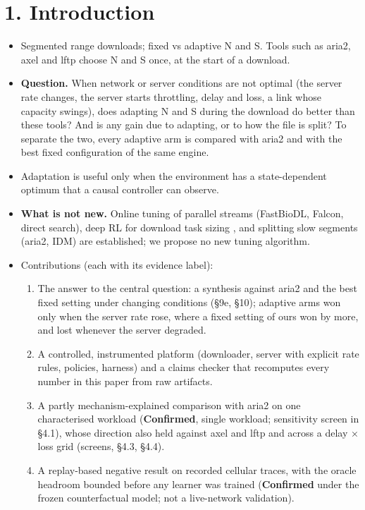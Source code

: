 \documentclass[conference]{IEEEtran}
\begin{document}
\section*{1. Introduction}

\begin{itemize}
\item Segmented range downloads; fixed vs adaptive N and S. Tools such as aria2, axel and lftp choose N and S once, at the start of a download.
\item \textbf{Question.} When network or server conditions are not optimal (the server rate changes, the server starts throttling, delay and loss, a link whose capacity swings), does adapting N and S during the download do better than these tools? And is any gain due to adapting, or to how the file is split? To separate the two, every adaptive arm is compared with aria2 and with the best fixed configuration of the same engine.
\item Adaptation is useful only when the environment has a state-dependent optimum that a causal controller can observe.
\item \textbf{What is not new.} Online tuning of parallel streams (FastBioDL, Falcon, direct search), deep RL for download task sizing \cite{liu2025deload}, and splitting slow segments (aria2, IDM) are established; we propose no new tuning algorithm.
\item Contributions (each with its evidence label):
\begin{enumerate}
\item The answer to the central question: a synthesis against aria2 and the best fixed setting under changing conditions (§9e, §10); adaptive arms won only when the server rate rose, where a fixed setting of ours won by more, and lost whenever the server degraded.
\item A controlled, instrumented platform (downloader, server with explicit rate rules, policies, harness) and a claims checker that recomputes every number in this paper from raw artifacts.
\item A partly mechanism-explained comparison with aria2 on one characterised workload (\textbf{Confirmed}, single workload; sensitivity screen in §4.1), whose direction also held against axel and lftp and across a delay × loss grid (screens, §4.3, §4.4).
\item A replay-based negative result on recorded cellular traces, with the oracle headroom bounded before any learner was trained (\textbf{Confirmed} under the frozen counterfactual model; not a live-network validation).

\end{enumerate}
\end{itemize}
\end{document}
